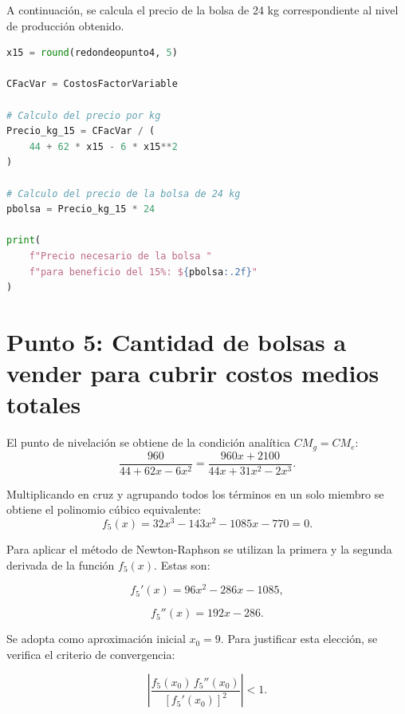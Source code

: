A continuación, se calcula el precio de la bolsa de 24 kg correspondiente al nivel de producción obtenido.

\begin{lstlisting}[language=Python,frame=single,caption=Cálculo final del precio de la bolsa,label={cod:calcbolsa}]
x15 = round(redondeopunto4, 5)

CFacVar = CostosFactorVariable

# Calculo del precio por kg
Precio_kg_15 = CFacVar / (
    44 + 62 * x15 - 6 * x15**2
)

# Calculo del precio de la bolsa de 24 kg
pbolsa = Precio_kg_15 * 24

print(
    f"Precio necesario de la bolsa "
    f"para beneficio del 15%: ${pbolsa:.2f}"
)
\end{lstlisting}



\section{Punto 5: Cantidad de bolsas a vender para cubrir costos medios totales}

El punto de nivelación se obtiene de la condición analítica $CM_g = CM_e$:
\begin{equation}
    \dfrac{960}{44 + 62x - 6x^2}
    =
    \dfrac{960x + 2100}{44x + 31x^2 - 2x^3}.
    \label{eq:f5}
\end{equation}

Multiplicando en cruz y agrupando todos los términos en un solo miembro se obtiene el polinomio cúbico equivalente:
\begin{equation}
    f_5(x) = 32x^3 - 143x^2 - 1085x - 770 = 0.
\end{equation}

Para aplicar el método de Newton-Raphson se utilizan la primera y la segunda derivada de la función $f_5(x)$. Estas son:

\begin{equation}
    f_5'(x) = 96x^2 - 286x - 1085,
\end{equation}

\begin{equation}
    f_5''(x) = 192x - 286.
\end{equation}

Se adopta como aproximación inicial $x_0 = 9$. Para justificar esta elección, se verifica el criterio de convergencia:

\begin{equation}
    \left|
    \frac{f_5(x_0)\,f_5''(x_0)}
    {[f_5'(x_0)]^2}
    \right| < 1.
\end{equation}

